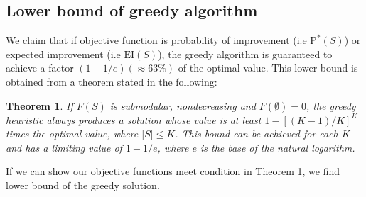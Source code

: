 \documentclass[11pt]{article}
\newcommand{\EI}{\mathrm{EI}}
\newcommand{\PI}{\text{P}^*}
\newtheorem{thm}{Theorem}
\begin{document}
\subsection{Lower bound of greedy algorithm}
We claim that if objective function is probability of improvement (i.e $\PI(S)$) or expected improvement (i.e $\EI(S)$), the greedy algorithm is guaranteed to achieve a factor $(1-1/e) (\approx 63\%)$ of the optimal value. This lower bound is obtained from a theorem stated in the following:

\begin{thm} \cite{Company1978}
If $F(S)$ is submodular, nondecreasing and $F(\emptyset)=0$, the greedy heuristic always produces a solution whose value is at least $1-[(K-1)/K]^K$ times the optimal value, where $|S| \leq K$. This bound can be achieved for each $K$ and has a limiting value of $1-1/e$, where $e$ is the base of the natural logarithm.
\end{thm}

If we can show our objective functions meet condition in Theorem 1, we find lower bound of the greedy solution.
\end{document}
